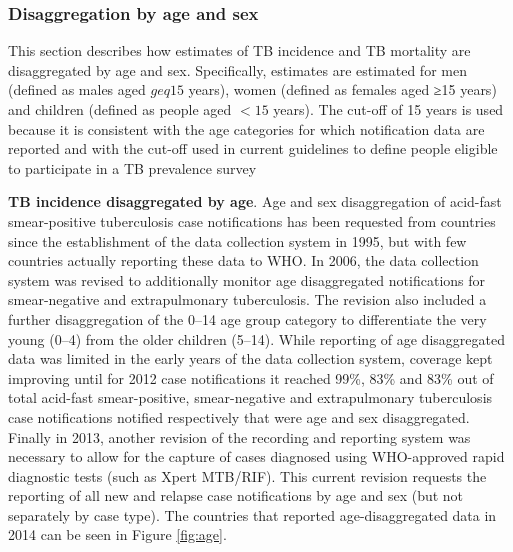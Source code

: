 \subsubsection{Disaggregation by age and sex}

This section describes how estimates of TB incidence and TB mortality are disaggregated by age and sex. Specifically, estimates are estimated for men (defined as males aged $geq 15$ years), women (defined as females aged ≥15 years) and children (defined as people aged $<15$ years). The cut-off of 15 years is used because it is consistent with the age categories for which notification data are reported and with the cut-off used in current guidelines to define people eligible to participate in a TB prevalence survey

\textbf{TB incidence disaggregated by age}. Age and sex disaggregation of acid-fast smear-positive tuberculosis case notifications has been requested from countries since the establishment of the data collection system in 1995, but with few countries actually reporting these data to WHO. In 2006, the data collection system was revised to additionally monitor age disaggregated notifications for smear-negative and extrapulmonary tuberculosis. The revision also included a further disaggregation of the 0–14 age group category to differentiate the very young (0–4) from the older children (5–14). While reporting of age disaggregated data was limited in the early years of the data collection system, coverage kept improving until for 2012 case notifications it reached 99\%, 83\% and 83\% out of total acid-fast smear-positive, smear-negative and extrapulmonary tuberculosis case notifications notified respectively that were age and sex disaggregated. Finally in 2013, another revision of the recording and reporting system was necessary to allow for the capture of cases diagnosed using WHO-approved rapid diagnostic tests (such as Xpert MTB/RIF)\cite{Who2013-td}. This current revision requests the reporting of all new and relapse case notifications by age and sex (but not separately by case type). The countries that reported age-disaggregated data in 2014 can be seen in Figure \ref{fig:age}.


